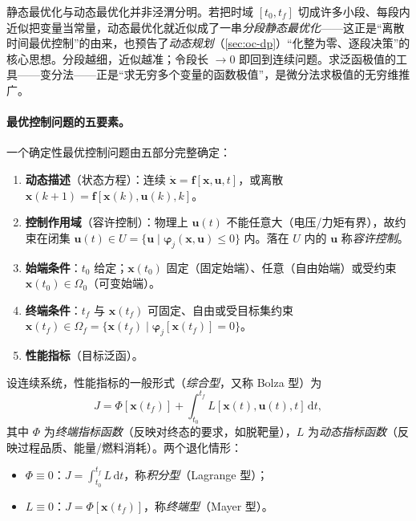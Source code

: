 \begin{insight}
静态最优化与动态最优化并非泾渭分明。若把时域 $[t_0,t_f]$ 切成许多小段、每段内近似把变量当常量，动态最优化就近似成了一串\emph{分段静态最优化}——这正是“离散时间最优控制”的由来，也预告了\emph{动态规划}（\cref{sec:oc-dp}）“化整为零、逐段决策”的核心思想。分段越细，近似越准；令段长 $\to0$ 即回到连续问题。求泛函极值的工具——变分法——正是“求无穷多个变量的函数极值”，是微分法求极值的无穷维推广。
\end{insight}

\paragraph{最优控制问题的五要素。}
一个确定性最优控制问题由五部分完整确定\cite{liubao2006modern}：
\begin{enumerate}
  \item \textbf{动态描述}（状态方程）：连续 $\dot{\mathbf{x}}=\mathbf{f}[\mathbf{x},\mathbf{u},t]$，或离散 $\mathbf{x}(k+1)=\mathbf{f}[\mathbf{x}(k),\mathbf{u}(k),k]$。
  \item \textbf{控制作用域}（容许控制）：物理上 $\mathbf{u}(t)$ 不能任意大（电压/力矩有界），故约束在闭集 $\mathbf{u}(t)\in U=\{\mathbf{u}\mid\boldsymbol\varphi_j(\mathbf{x},\mathbf{u})\le0\}$ 内。落在 $U$ 内的 $\mathbf{u}$ 称\emph{容许控制}。
  \item \textbf{始端条件}：$t_0$ 给定；$\mathbf{x}(t_0)$ 固定（固定始端）、任意（自由始端）或受约束 $\mathbf{x}(t_0)\in\Omega_0$（可变始端）。
  \item \textbf{终端条件}：$t_f$ 与 $\mathbf{x}(t_f)$ 可固定、自由或受目标集约束 $\mathbf{x}(t_f)\in\Omega_f=\{\mathbf{x}(t_f)\mid\boldsymbol\varphi_j[\mathbf{x}(t_f)]=0\}$。
  \item \textbf{性能指标}（目标泛函）。
\end{enumerate}

\begin{definition}[三类性能指标]\label{def:oc-perf-types}
设连续系统，性能指标的一般形式（\emph{综合型}，又称 Bolza 型）为
\begin{equation}
  J=\Phi[\mathbf{x}(t_f)]+\int_{t_0}^{t_f}L[\mathbf{x}(t),\mathbf{u}(t),t]\,\mathrm dt,
  \label{eq:oc-bolza}
\end{equation}
其中 $\Phi$ 为\emph{终端指标函数}（反映对终态的要求，如脱靶量），$L$ 为\emph{动态指标函数}（反映过程品质、能量/燃料消耗）。两个退化情形：
\begin{itemize}
  \item $\Phi\equiv0$：$J=\int_{t_0}^{t_f}L\,\mathrm dt$，称\emph{积分型}（Lagrange 型）；
  \item $L\equiv0$：$J=\Phi[\mathbf{x}(t_f)]$，称\emph{终端型}（Mayer 型）。
\end{itemize}
\end{definition}

